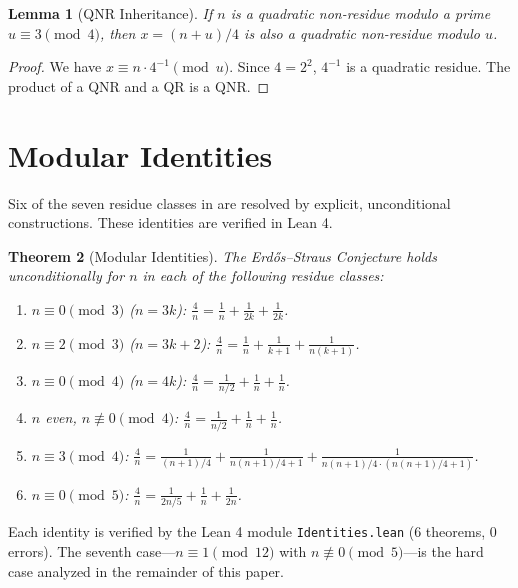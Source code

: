 \documentclass[11pt,a4paper]{article}
\theoremstyle{plain}
\newtheorem{theorem}{Theorem}[section]
\newtheorem{lemma}[theorem]{Lemma}
\theoremstyle{plain}
\theoremstyle{definition}
\numberwithin{equation}{section}
\begin{document}
\begin{lemma}[QNR Inheritance]\label{lem:qnr}
If $n$ is a quadratic non-residue modulo a prime $u \equiv 3 \pmod{4}$, then $x = (n+u)/4$ is also a quadratic non-residue modulo $u$.
\end{lemma}

\begin{proof}
We have $x \equiv n \cdot 4^{-1} \pmod{u}$. Since $4 = 2^2$, $4^{-1}$ is a quadratic residue. The product of a QNR and a QR is a QNR.
\end{proof}

\clearpage

\section{Modular Identities}\label{sec:modular}

Six of the seven residue classes in  are resolved by explicit, unconditional constructions. These identities are verified in Lean 4.

\begin{theorem}[Modular Identities]
The Erd\H{o}s--Straus Conjecture holds unconditionally for $n$ in each of the following residue classes:
\begin{enumerate}[noitemsep]
  \item $n \equiv 0 \pmod{3}$ ($n = 3k$): $\frac{4}{n} = \frac{1}{n} + \frac{1}{2k} + \frac{1}{2k}$.
  \item $n \equiv 2 \pmod{3}$ ($n = 3k+2$): $\frac{4}{n} = \frac{1}{n} + \frac{1}{k+1} + \frac{1}{n(k+1)}$.
  \item $n \equiv 0 \pmod{4}$ ($n = 4k$): $\frac{4}{n} = \frac{1}{n/2} + \frac{1}{n} + \frac{1}{n}$.
  \item $n$ even, $n \not\equiv 0 \pmod{4}$: $\frac{4}{n} = \frac{1}{n/2} + \frac{1}{n} + \frac{1}{n}$.
  \item $n \equiv 3 \pmod{4}$: $\frac{4}{n} = \frac{1}{(n+1)/4} + \frac{1}{n(n+1)/4 + 1} + \frac{1}{n(n+1)/4 \cdot (n(n+1)/4 + 1)}$.
  \item $n \equiv 0 \pmod{5}$: $\frac{4}{n} = \frac{1}{2n/5} + \frac{1}{n} + \frac{1}{2n}$.
\end{enumerate}
\end{theorem}

Each identity is verified by the Lean 4 module \texttt{Identities.lean} (6 theorems, 0 errors). The seventh case---$n \equiv 1 \pmod{12}$ with $n \not\equiv 0 \pmod{5}$---is the hard case analyzed in the remainder of this paper.
\end{document}

